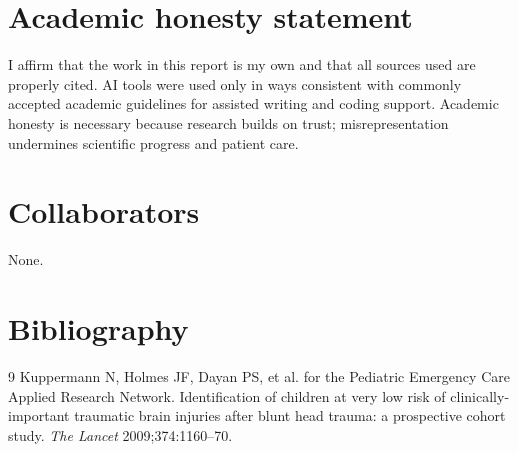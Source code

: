 \documentclass[12ptpt,letterpaper]{article}
\begin{document}
\section{Academic honesty statement}\label{academic-honesty-statement}

I affirm that the work in this report is my own and that all sources used are properly cited. AI tools were used only in ways consistent with commonly accepted academic guidelines for assisted writing and coding support. Academic honesty is necessary because research builds on trust; misrepresentation undermines scientific progress and patient care.

\section{Collaborators}\label{collaborators}

None.

\section{Bibliography}\label{bibliography}

\begin{thebibliography}{9}
Kuppermann N, Holmes JF, Dayan PS, et al. for the Pediatric Emergency Care Applied Research Network.
Identification of children at very low risk of clinically-important traumatic brain injuries after blunt head trauma: a prospective cohort study.
\textit{The Lancet} 2009;374:1160--70.
\end{thebibliography}
\end{document}
